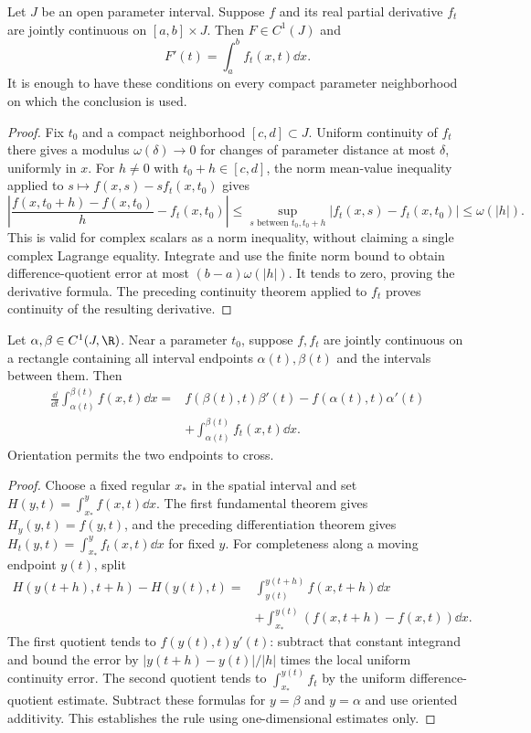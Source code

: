 \begin{theorem}
Let $J$ be an open parameter interval. Suppose $f$ and its real partial
derivative $f_t$ are jointly continuous on $[a,b]\times J$.
Then $F\in C^1(J)$ and
\[F'(t)=\int_a^bf_t(x,t)\dd x.
\]
It is enough to have these conditions on every compact parameter
neighborhood on which the conclusion is used.
\end{theorem}
\begin{proof}
Fix $t_0$ and a compact neighborhood $[c,d]\subset J$.
Uniform continuity of $f_t$ there gives a modulus $\omega(\delta)\to0$
for changes of parameter distance at most $\delta$, uniformly in $x$.
For $h\ne0$ with $t_0+h\in[c,d]$, the norm mean-value inequality
applied to $s\mapsto f(x,s)-s f_t(x,t_0)$ gives
\[\left|\frac{f(x,t_0+h)-f(x,t_0)}h-f_t(x,t_0)\right|
\le\sup_{s\text{ between }t_0,t_0+h}|f_t(x,s)-f_t(x,t_0)|
\le\omega(|h|).
\]
This is valid for complex scalars as a norm inequality, without claiming
a single complex Lagrange equality. Integrate and use the finite norm
bound to obtain difference-quotient error at most $(b-a)\omega(|h|)$.
It tends to zero, proving the derivative formula. The preceding continuity
theorem applied to $f_t$ proves continuity of the resulting derivative.
\end{proof}

\begin{theorem}
Let $\alpha,\beta\in C^1(J,\R)$. Near a parameter $t_0$, suppose
$f,f_t$ are jointly continuous on a rectangle containing all interval
endpoints $\alpha(t),\beta(t)$ and the intervals between them. Then
\begin{align*}
\frac{\dd}{\dd t}\int_{\alpha(t)}^{\beta(t)}f(x,t)\dd x
={}&f(\beta(t),t)\beta'(t)-f(\alpha(t),t)\alpha'(t)\\
&+\int_{\alpha(t)}^{\beta(t)}f_t(x,t)\dd x.
\end{align*}
Orientation permits the two endpoints to cross.
\end{theorem}
\begin{proof}
Choose a fixed regular $x_*$ in the spatial interval and set
$H(y,t)=\int_{x_*}^yf(x,t)\dd x$. The first fundamental theorem gives
$H_y(y,t)=f(y,t)$, and the preceding differentiation theorem gives
$H_t(y,t)=\int_{x_*}^yf_t(x,t)\dd x$ for fixed $y$.
For completeness along a moving endpoint $y(t)$, split
\begin{align*}
H(y(t+h),t+h)-H(y(t),t)
={}&\int_{y(t)}^{y(t+h)}f(x,t+h)\dd x\\
&+\int_{x_*}^{y(t)}(f(x,t+h)-f(x,t))\dd x.
\end{align*}
The first quotient tends to $f(y(t),t)y'(t)$: subtract that constant
integrand and bound the error by
$|y(t+h)-y(t)|/|h|$ times the local uniform continuity error.
The second quotient tends to $\int_{x_*}^{y(t)}f_t$ by the uniform
difference-quotient estimate. Subtract these formulas for $y=\beta$
and $y=\alpha$ and use oriented additivity. This establishes the rule
using one-dimensional estimates only.
\end{proof}

